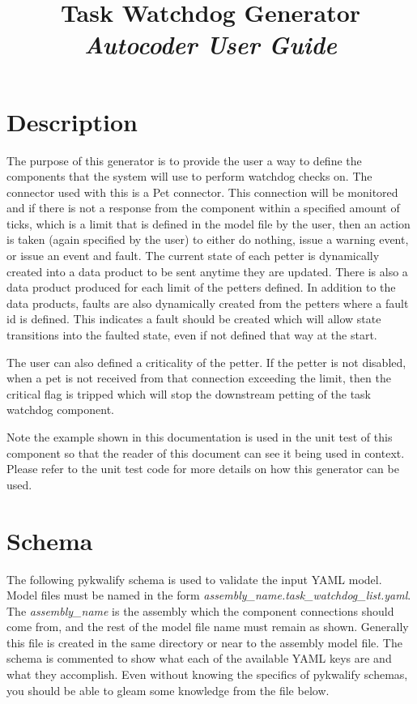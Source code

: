 



\title{\textbf{Task Watchdog Generator} \\
\large\textit{Autocoder User Guide}}
\date{}
\maketitle

\section{Description}

The purpose of this generator is to provide the user a way to define the components that the system will use to perform watchdog checks on. The connector used with this is a Pet connector. This connection will be monitored and if there is not a response from the component within a specified amount of ticks, which is a limit that is defined in the model file by the user, then an action is taken (again specified by the user) to either do nothing, issue a warning event, or issue an event and fault. The current state of each petter is dynamically created into a data product to be sent anytime they are updated. There is also a data product produced for each limit of the petters defined. In addition to the data products, faults are also dynamically created from the petters where a fault id is defined. This indicates a fault should be created which will allow state transitions into the faulted state, even if not defined that way at the start.

The user can also defined a criticality of the petter. If the petter is not disabled, when a pet is not received from that connection exceeding the limit, then the critical flag is tripped which will stop the downstream petting of the task watchdog component.

Note the example shown in this documentation is used in the unit test of this component so that the reader of this document can see it being used in context. Please refer to the unit test code for more details on how this generator can be used.

\section{Schema}

The following pykwalify schema is used to validate the input YAML model. Model files must be named in the form \textit{assembly\_name.task\_watchdog\_list.yaml}. The \textit{assembly\_name} is the assembly which the component connections should come from, and the rest of the model file name must remain as shown. Generally this file is created in the same directory or near to the assembly model file. The schema is commented to show what each of the available YAML keys are and what they accomplish. Even without knowing the specifics of pykwalify schemas, you should be able to gleam some knowledge from the file below.

